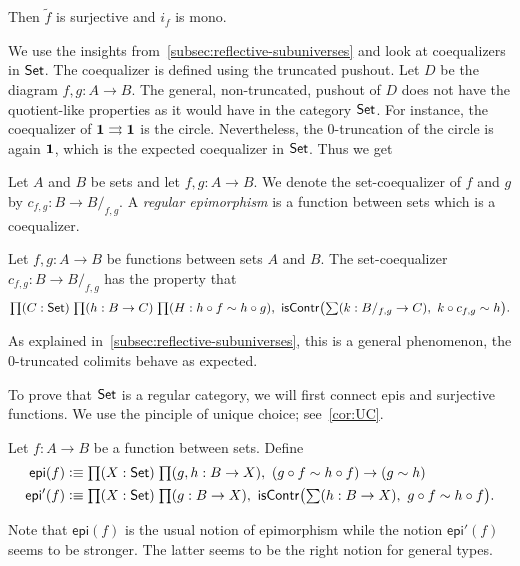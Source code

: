 \begin{lem}
Then $\tilde{f}$ is surjective and $i_f$ is mono.
\end{lem}

We use the insights from~\autoref{subsec:reflective-subuniverses} and look at coequalizers
in $\mathsf{Set}$. The coequalizer is defined using the truncated pushout. Let $D$ be the diagram $f,g:A\to B$.
The general, non-truncated, pushout of $D$ does not have the quotient-like properties as it would
have in the category $\mathsf{Set}$. For instance, the coequalizer of
$\mathbf{1}\rightrightarrows\mathbf{1}$ is the circle. Nevertheless,
the $0$-truncation of the circle is again $\mathbf{1}$, which is the
expected coequalizer in $\mathsf{Set}$. Thus we get

\begin{defn}
Let $A$ and $B$ be sets and let $f,g:A\to B$.
We denote the set-coequalizer of $f$ and $g$ by $c_{f,g}:B\to B/_{f,g}$. A
\emph{regular epimorphism} is a function between sets which is a coequalizer.
\end{defn}

\begin{lem}
Let $f,g:A\to B$ be functions between sets $A$ and $B$. The 
{set-co}equalizer $c_{f,g}:B\to B/_{f,g}$ has the property that
\begin{equation*}
\prd{C:\set}{h:B\to C}{H:h\circ f\sim h\circ g}
\mathsf{isContr}\big(\sm{k:B/_{f,g}\to C} k\circ c_{f,g}\sim h\big).
\end{equation*}
\end{lem}

As explained in~\autoref{subsec:reflective-subuniverses}, this is a general phenomenon, the 0-truncated colimits behave as expected.

To prove that $\mathsf{Set}$ is a regular category, we will first connect epis and surjective functions. 
We use the pinciple of unique choice; see~\autoref{cor:UC}. 

\begin{defn}
Let $f:A\to B$ be a function between sets. Define
\begin{align*}
\mathsf{epi}(f) & \defeq \prd{X:\set}{g,h:B\to X}
(g\circ f\sim h\circ f)\to (g\sim h)\\
\mathsf{epi}'(f) & \defeq\prd{X:\set}{g:B\to X}
\mathsf{isContr}\big(\sm{h:B\to X} g\circ f\sim h\circ f\big).
\end{align*}
\end{defn}

Note that $\mathsf{epi}(f)$ is the usual notion of epimorphism while the
notion $\mathsf{epi}'(f)$ seems to be stronger. The latter seems to be the right notion for general types.


